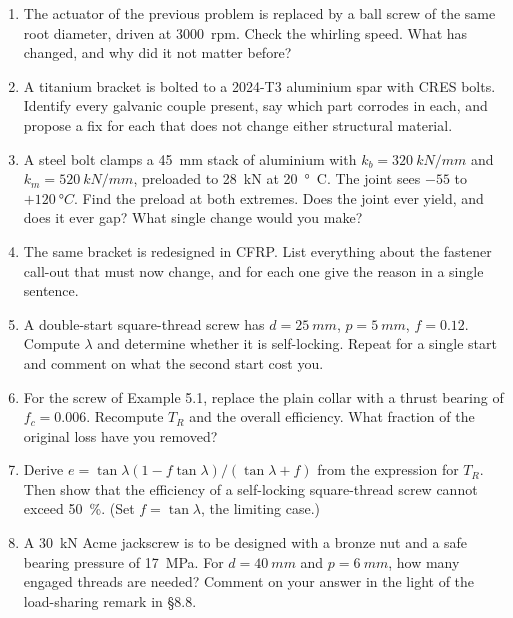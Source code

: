 \documentclass[11pt,a4paper]{article}
\begin{document}
\begin{enumerate}[nosep,leftmargin=1.5em]
        at \SI{14}{kN} over a free length of \SI{900}{mm}, supported fixed at the gearbox and free
        at the load. Check it for buckling at a factor of 3. If it fails, find the smallest standard
        change that fixes it --- and say why you chose that one rather than a bigger screw.
  \item The actuator of the previous problem is replaced by a ball screw of the same root diameter,
        driven at \SI{3000}{rpm}. Check the whirling speed. What has changed, and why did it not
        matter before?
  \item A titanium bracket is bolted to a 2024-T3 aluminium spar with CRES bolts. Identify every
        galvanic couple present, say which part corrodes in each, and propose a fix for each that
        does not change either structural material.
  \item A steel bolt clamps a \SI{45}{mm} stack of aluminium with $k_b=\SI{320}{kN/mm}$ and
        $k_m=\SI{520}{kN/mm}$, preloaded to \SI{28}{kN} at \SI{20}{\degree C}. The joint sees
        $-55$ to $+\SI{120}{\degree C}$. Find the preload at both extremes. Does the joint ever
        yield, and does it ever gap? What single change would you make?
  \item The same bracket is redesigned in CFRP. List everything about the fastener call-out that
        must now change, and for each one give the reason in a single sentence.
  \item A double-start square-thread screw has $d=\SI{25}{mm}$, $p=\SI{5}{mm}$, $f=0.12$. Compute
        $\lambda$ and determine whether it is self-locking. Repeat for a single start and comment on
        what the second start cost you.
  \item For the screw of Example 5.1, replace the plain collar with a thrust bearing of
        $f_c = 0.006$. Recompute $T_R$ and the overall efficiency. What fraction of the original loss
        have you removed?
  \item Derive $e = \tan\lambda(1-f\tan\lambda)/(\tan\lambda+f)$ from the expression for $T_R$. Then
        show that the efficiency of a self-locking square-thread screw cannot exceed \SI{50}{\percent}.
        (Set $f = \tan\lambda$, the limiting case.)
  \item A \SI{30}{kN} Acme jackscrew is to be designed with a bronze nut and a safe bearing pressure
        of \SI{17}{MPa}. For $d=\SI{40}{mm}$ and $p=\SI{6}{mm}$, how many engaged threads are needed?
        Comment on your answer in the light of the load-sharing remark in \S8.8.

\end{enumerate}
\end{document}
